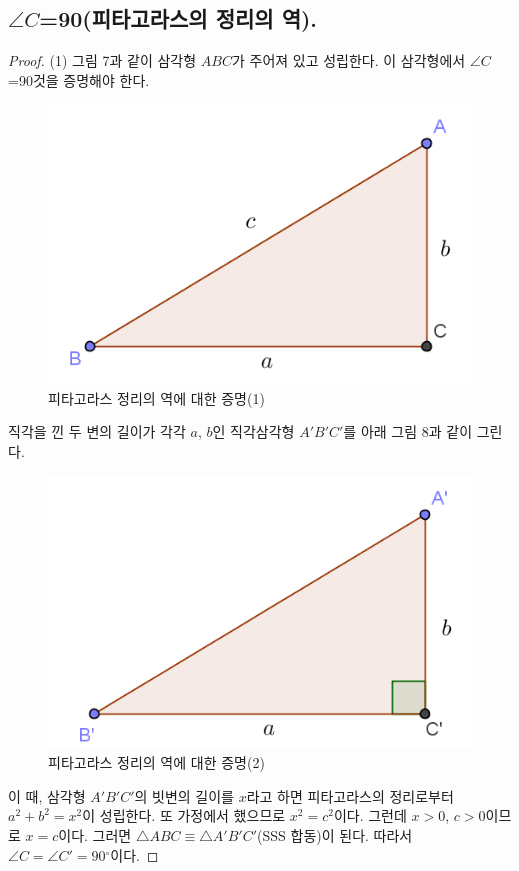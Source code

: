 \documentclass{article}
\newcommand{\C}{\ensuremath{\angle C}}
\newcommand{\D}{\ensuremath{{}^\circ}}
\newcommand{\PP}{\ensuremath{a^2+b^2=c^2}}
\begin{document}
\subsection{ \C=90(피타고라스의 정리의 역).}
\begin{proof}(1)
그림 7과 같이 삼각형 \(ABC\)가 주어져 있고  성립한다.
이 삼각형에서 \C=90 것을 증명해야 한다.
\begin{figure}[h]
\center
\includegraphics{3_5_1}
\caption{피타고라스 정리의 역에 대한 증명(1)}
\end{figure}

직각을 낀 두 변의 길이가 각각 \(a\), \(b\)인 직각삼각형 \(A'B'C'\)를 아래 그림 8과 같이 그린다.
\begin{figure}[h]
\center
\includegraphics{3_5_2}
\caption{피타고라스 정리의 역에 대한 증명(2)}
\end{figure}
이 때, 삼각형 \(A'B'C'\)의 빗변의 길이를 \(x\)라고 하면 피타고라스의 정리로부터 \(a^2+b^2=x^2\)이 성립한다.
또 가정에서  했으므로 \(x^2=c^2\)이다.
그런데 \(x>0\), \(c>0\)이므로 \(x=c\)이다.
그러면 \(\triangle ABC\equiv\triangle A'B'C'\)(SSS 합동)이 된다.
따라서 \(\angle C=\angle C'=90\D\)이다.
\end{proof}
\end{document}
